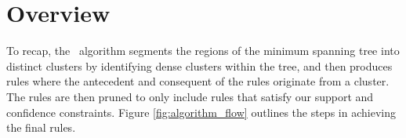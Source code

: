 \section{Overview}
To recap, the \algo\ algorithm segments the regions of the minimum spanning tree into distinct clusters by identifying dense clusters within the tree, and then produces rules where the antecedent and consequent of the rules originate from a cluster. The rules are then pruned to only include rules that satisfy our support and confidence constraints. Figure \ref{fig:algorithm_flow} outlines the steps in achieving the final rules.